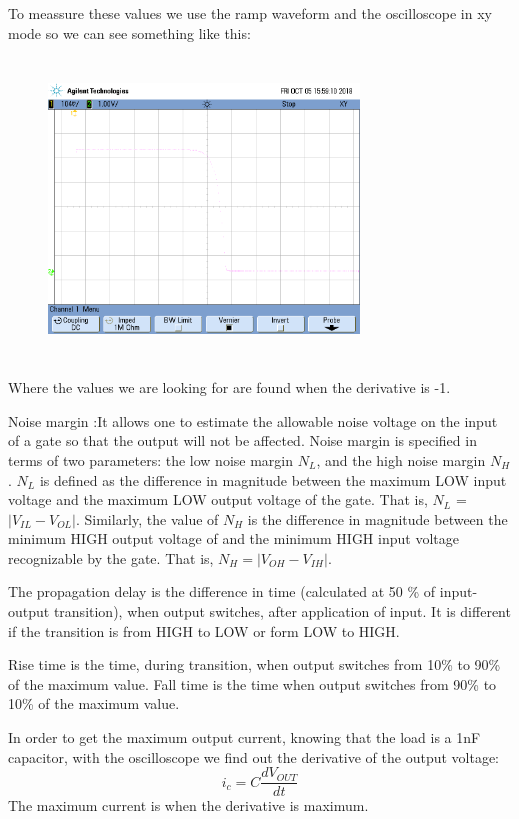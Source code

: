 To meassure these values we use the ramp waveform and the oscilloscope in xy mode so we can see something like this:
\begin{figure}[H] 
    \begin{center}
    \includegraphics[width=8.25cm,height=8cm]{data/xy_ttl_bjt.png}
    \end{center}
    \caption{}
    \label{fig:measures}
    \end{figure}     
Where the values we are looking for are found when the derivative is -1.

Noise margin :It allows one to estimate the allowable noise voltage on the input of a 
gate so that the output will not be affected. Noise margin is specified
 in terms of two parameters: the low noise margin $N_{L}$, and the high noise 
 margin $N_{H}$ . $N_{L}$ is defined as the difference in magnitude
  between the maximum LOW input voltage and the maximum 
  LOW output voltage of the gate. That is, $N_{L}$ =$|V_{IL} - V_{OL}|$.
   Similarly, the value of $N_{H}$ is the difference in 
   magnitude between the minimum HIGH output voltage of 
   and the minimum HIGH input voltage recognizable by 
   the gate. That is, $N_{H} =|V_{OH} - V_{IH}|.$ 


The propagation delay  is the difference in time (calculated at 50
\% of input-output transition), when output switches, after 
application of input. It is different if the transition is
 from HIGH to LOW or form LOW to HIGH.

 Rise time is the time, during transition, when output switches from 10\% to 90\% of the maximum value.
Fall time is the time when output switches from 90\% to 10\% of the maximum value.

In order to get the maximum output current, knowing that the
 load is a 1nF capacitor, with the oscilloscope we find out
  the derivative of the output voltage:
\begin{equation}
    i_{c}=C\frac{dV_{OUT}}{dt}
\end{equation}
The maximum current is when the derivative is maximum.
